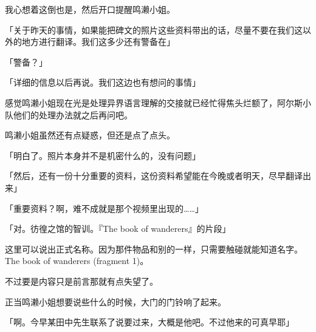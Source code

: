 我心想着这倒也是，然后开口提醒鸣濑小姐。

「关于昨天的事情，如果能把碑文的照片这些资料带出的话，尽量不要在我们这以外的地方进行翻译。我们这多少还有警备在」

「警备？」

「详细的信息以后再说。我们这边也有想问的事情」

感觉鸣濑小姐现在光是处理异界语言理解的交接就已经忙得焦头烂额了，阿尔斯小队他们的处理办法就之后再问吧。

鸣濑小姐虽然还有点疑惑，但还是点了点头。

「明白了。照片本身并不是机密什么的，没有问题」

「然后，还有一份十分重要的资料，这份资料希望能在今晚或者明天，尽早翻译出来」

「重要资料？啊，难不成就是那个视频里出现的……」

「对。彷徨之馆的智训。『The book of wanderers』的片段」

这里可以说出正式名称。因为那件物品和别的一样，只需要触碰就能知道名字。The book of wanderers (fragment 1)。

不过要是内容只是前言那就有点失望了。

正当鸣濑小姐想要说些什么的时候，大门的门铃响了起来。

「啊。今早某田中先生联系了说要过来，大概是他吧。不过他来的可真早耶」

